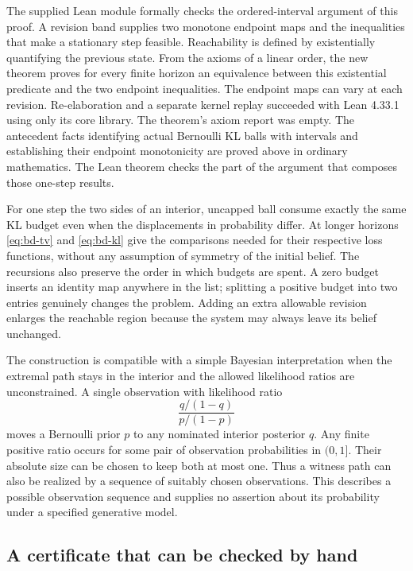 \documentclass[12pt,letterpaper]{article}
\begin{document}
The supplied Lean module formally checks the ordered-interval argument of this proof. A revision band supplies two monotone endpoint maps and the inequalities that make a stationary step feasible. Reachability is defined by existentially quantifying the previous state. From the axioms of a linear order, the new theorem proves for every finite horizon an equivalence between this existential predicate and the two endpoint inequalities. The endpoint maps can vary at each revision. Re-elaboration and a separate kernel replay succeeded with Lean 4.33.1 using only its core library. The theorem's axiom report was empty. The antecedent facts identifying actual Bernoulli KL balls with intervals and establishing their endpoint monotonicity are proved above in ordinary mathematics. The Lean theorem checks the part of the argument that composes those one-step results.

For one step the two sides of an interior, uncapped ball consume exactly the same KL budget even when the displacements in probability differ. At longer horizons \eqref{eq:bd-tv} and \eqref{eq:bd-kl} give the comparisons needed for their respective loss functions, without any assumption of symmetry of the initial belief. The recursions also preserve the order in which budgets are spent. A zero budget inserts an identity map anywhere in the list; splitting a positive budget into two entries genuinely changes the problem. Adding an extra allowable revision enlarges the reachable region because the system may always leave its belief unchanged.

The construction is compatible with a simple Bayesian interpretation when the extremal path stays in the interior and the allowed likelihood ratios are unconstrained. A single observation with likelihood ratio
\[
 \frac{q/(1-q)}{p/(1-p)}
\]
moves a Bernoulli prior $p$ to any nominated interior posterior $q$. Any finite positive ratio occurs for some pair of observation probabilities in $(0,1]$. Their absolute size can be chosen to keep both at most one. Thus a witness path can also be realized by a sequence of suitably chosen observations. This describes a possible observation sequence and supplies no assertion about its probability under a specified generative model.

\subsection{A certificate that can be checked by hand}
\end{document}
